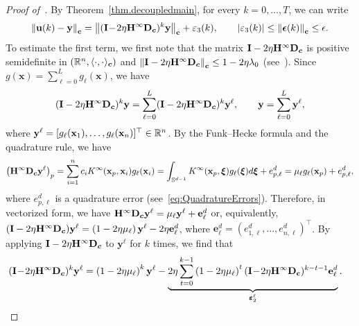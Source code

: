 \begin{proof}[Proof of~]
By Theorem~\ref{thm.decoupledmain}, for every $k = 0, \ldots, T$, we can write
\begin{equation}\label{eq.L2expressmain}
    \left\lVert\mathbf{u}(k) - \mathbf{y}\right\rVert_{\mathbf{c}} = \left\lVert(\mathbf{I} \!-\! 2\eta {\mathbf{H}}^\infty\mathbf{D}_{\boldsymbol{c}})^k\mathbf{y}\right\rVert_{\mathbf{c}} + \varepsilon_3(k), \qquad \left|\varepsilon_3(k)\right| \leq \left\lVert\boldsymbol{\epsilon}(k)\right\rVert_{\mathbf{c}} \leq \epsilon.
\end{equation}
To estimate the first term, we first note that the matrix $\mathbf{I} - 2\eta{\mathbf{H}}^\infty \mathbf{D}_{\boldsymbol{c}}$ is positive semidefinite in $(\mathbb{R}^n, \langle {\cdot}, {\cdot} \rangle_{\boldsymbol{c}})$ and $\left\lVert\mathbf{I} - 2\eta{\mathbf{H}}^\infty \mathbf{D}_{\boldsymbol{c}}\right\rVert_{\mathbf{c}} \leq 1 - 2\eta\lambda_0$ (see~). Since $g(\mathbf{x}) = \sum_{\ell=0}^Lg_\ell(\mathbf{x})$, we have 
\[
(\mathbf{I} - 2\eta {\mathbf{H}}^\infty\mathbf{D}_{\boldsymbol{c}})^k\mathbf{y} = \sum_{\ell=0}^L (\mathbf{I} - 2\eta {\mathbf{H}}^\infty\mathbf{D}_{\boldsymbol{c}})^k\mathbf{y}^\ell,\qquad \mathbf{y} = \sum_{\ell=0}^L \mathbf{y}^\ell,
\]
where $\mathbf{y}^\ell = [g_\ell(\mathbf{x}_1),\ldots, g_\ell(\mathbf{x}_n)]^\top \in\mathbb{R}^n$. By the Funk--Hecke formula and the quadrature rule, we have
\begin{align*}
    \left({\mathbf{H}}^\infty\mathbf{D}_{\boldsymbol{c}} \mathbf{y}^\ell\right)_p = \sum_{i=1}^n c_i {K}^\infty( {\mathbf{x}}_p , {\mathbf{x}}_i) g_\ell({\mathbf{x}}_i) = \int_{{\mathbb{S}}^{d-1}} {K}^\infty(\mathbf{x}_p, \boldsymbol{\xi}) g_\ell(\boldsymbol{\xi}) d \boldsymbol{\xi} + e_{p,\ell}^d = \mu_\ell g_\ell(\mathbf{x}_p) + e_{p,\ell}^d,
\end{align*}
where $e_{p,\ell}^d$ is a quadrature error (see~\cref{eq:QuadratureErrors}). Therefore, in vectorized form, we 
have ${\mathbf{H}}^\infty \mathbf{D}_{\boldsymbol{c}} \mathbf{y}^\ell = \mu_\ell\mathbf{y}^\ell + \mathbf{e}^d_\ell$ or, equivalently, $(\mathbf{I} - 2\eta{\mathbf{H}}^\infty\mathbf{D}_{\boldsymbol{c}}) \mathbf{y}^\ell = \left(1-2\eta\mu_\ell\right) \mathbf{y}^\ell - 2\eta\mathbf{e}^d_\ell$, where $\mathbf{e}^d_\ell = ({e}^d_{1,\ell}, \ldots, {e}^d_{n,\ell})^\top$. By applying $\mathbf{I} - 2\eta{\mathbf{H}}^\infty\mathbf{D}_{\boldsymbol{c}}$ to $\mathbf{y}^\ell$ for $k$ times, we find that
\begin{align*}
    (\mathbf{I} \!-\! 2\eta {\mathbf{H}}^\infty\Dc)^k\mathbf{y}^\ell &= \left(1-2\eta\mu_\ell\right)^k \mathbf{y}^\ell - \underbrace{2\eta \sum_{t = 0}^{k-1} \left(1-2\eta\mu_\ell\right)^t (\mathbf{I} \!-\! 2\eta {\mathbf{H}}^\infty\mathbf{D}_\mathbf{\boldsymbol{c}})^{k-t-1} \mathbf{e}^d_\ell}_{\boldsymbol{\varepsilon}_2^\ell}.

\end{align*}
\end{proof}

